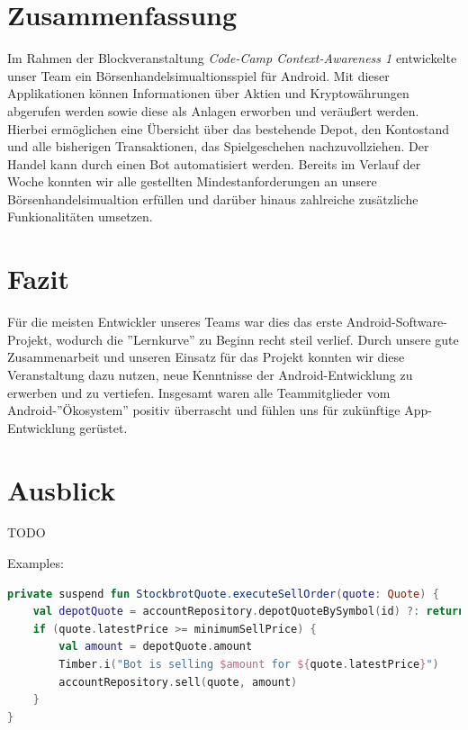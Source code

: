 \documentclass[a4paper]{article}
\begin{document}
\section{Zusammenfassung}
\label{sec:summary}
Im Rahmen der Blockveranstaltung \textit{Code-Camp Context-Awareness 1} entwickelte unser Team ein Börsenhandelsimualtionsspiel für Android. Mit dieser Applikationen können Informationen über Aktien und Kryptowährungen abgerufen werden sowie diese als Anlagen erworben und veräußert werden. Hierbei ermöglichen eine Übersicht über das bestehende Depot, den Kontostand und alle bisherigen Transaktionen, das Spielgeschehen nachzuvollziehen. Der Handel kann durch einen Bot automatisiert werden. \newline
Bereits im Verlauf der Woche konnten wir alle gestellten Mindestanforderungen an unsere Börsenhandelsimualtion erfüllen und darüber hinaus zahlreiche zusätzliche Funkionalitäten umsetzen.


\section{Fazit}
\label{sec:conclusion}
Für die meisten Entwickler unseres Teams war dies das erste Android-Software-Projekt, wodurch die ''Lernkurve'' zu Beginn recht steil verlief. Durch unsere gute Zusammenarbeit und unseren Einsatz für das Projekt konnten wir diese Veranstaltung dazu nutzen, neue Kenntnisse der Android-Entwicklung zu erwerben und zu vertiefen. Insgesamt waren alle Teammitglieder vom Android-''Ökosystem'' positiv überrascht und fühlen uns für zukünftige App-Entwicklung gerüstet.


\section{Ausblick}
\label{sec:outlook}
TODO


\printbibliography[title={Referenzen}]


\pagebreak
Examples:\\

\begin{lstlisting}[caption={example kotlin code}, captionpos=b, label={lst:example}, language=Kotlin]
private suspend fun StockbrotQuote.executeSellOrder(quote: Quote) {
    val depotQuote = accountRepository.depotQuoteBySymbol(id) ?: return
    if (quote.latestPrice >= minimumSellPrice) {
        val amount = depotQuote.amount
        Timber.i("Bot is selling $amount for ${quote.latestPrice}")
        accountRepository.sell(quote, amount)
    }
}
\end{lstlisting}
\end{document}
